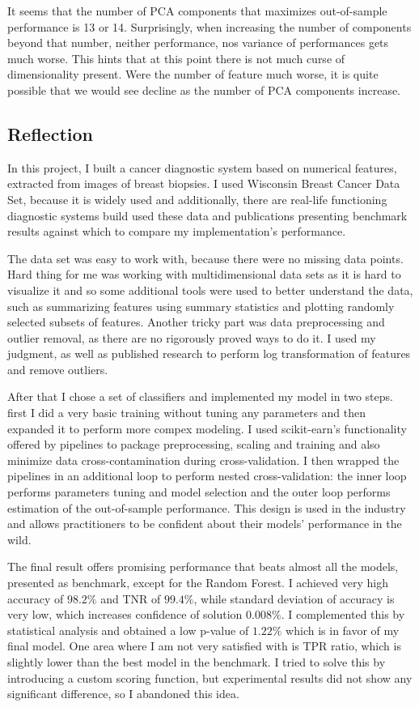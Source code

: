 \documentclass[10pt, a4paper]{article}
\begin{document}
It seems that the number of PCA components that maximizes out-of-sample performance is 13 or 14. Surprisingly, when increasing the number of components beyond that number, neither performance, nos variance of performances gets much worse. This hints that at this point there is not much curse of dimensionality present. Were the number of feature much worse, it is quite possible that we would see decline as the number of PCA components increase.

\subsection{Reflection}

In this project, I built a cancer diagnostic system based on numerical features, extracted from images of breast biopsies. I used Wisconsin Breast Cancer Data Set, because it is widely used and additionally, there are real-life functioning diagnostic systems build used these data and publications presenting benchmark results against which to compare my implementation's performance. 

The data set was easy to work with, because there were no missing data points. Hard thing for me was working with multidimensional data sets as it is hard to visualize it and so some additional tools were used to better understand the data, such as summarizing features using summary statistics and plotting randomly selected subsets of features. Another tricky part was data preprocessing and outlier removal, as there are no rigorously proved ways to do it. I used my judgment, as well as published research to perform log transformation of features and remove outliers.

After that I chose a set of classifiers and implemented my model in two steps. first I did a very basic training without tuning any parameters and then expanded it to perform more compex modeling. I used scikit-earn's functionality offered by pipelines to package preprocessing, scaling and training and also minimize data cross-contamination during cross-validation. I then wrapped the pipelines in an additional loop to perform nested cross-validation: the inner loop performs parameters tuning and model selection and the outer loop performs estimation of the out-of-sample performance. This design is used in the industry and allows practitioners to be confident about their models' performance in the wild.

The final result offers promising performance that beats almost all the models, presented as benchmark, except for the Random Forest. I achieved very high accuracy of $98.2\%$ and TNR of $99.4\%$, while standard deviation of accuracy is very low, which increases confidence of solution $0.008\%$. I complemented this by statistical analysis and obtained a low p-value of $1.22\%$ which is in favor of my final model. One area where I am not very satisfied with is TPR ratio, which is slightly lower than the best model in the benchmark. I tried to solve this by introducing a custom scoring function, but experimental results did not show any significant difference, so I abandoned this idea.
\end{document}
